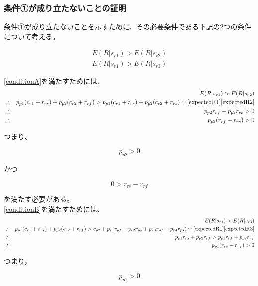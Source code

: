 \subsubsection{条件①が成り立たないことの証明}

条件①が成り立たないことを示すために、その必要条件である下記の2つの条件について考える。

\begin{gather}
  E(R|s_{r1}) > E(R|s_{r2}) \label{conditionA} \\
  E(R|s_{r1}) > E(R|s_{r3}) \label{conditionB}
\end{gather}

\eqref{conditionA}を満たすためには、
\begin{eqnarray*}
  &&E(R|s_{r1}) > E(R|s_{r2}) \\
  &\therefore& p_{p1} (c_{r1} + r_{rs}) + p_{p2} (c_{r2} + r_{rf}) > p_{p1} (c_{r1} + r_{rs}) + p_{p2} (c_{r2} + r_{rs}) \because\eqref{expectedR1}\eqref{expectedR2}  \\
  &\therefore& p_{p2} r_{rf} - p_{p2} r_{rs} > 0 \\
  &\therefore& p_{p2} (r_{rf} - r_{rs}) > 0 \\
\end{eqnarray*}

つまり、

\begin{equation}
  p_{p2} > 0 \nonumber
\end{equation}

かつ

\begin{equation}
\label{quad1}
  0 > r_{rs} - r_{rf}
\end{equation}

を満たす必要がある。\\


\eqref{conditionB}を満たすためには、
\begin{eqnarray*}
  &&E(R|s_{r1}) > E(R|s_{r3}) \\
  &\therefore& p_{p1} (c_{r1} + r_{rs}) + p_{p2} (c_{r2} + r_{rf}) > c_{p2} + p_{r1} r_{pf} + p_{r2} r_{ps} + p_{r3} r_{pf} + p_{r4} r_{ps}) \because\eqref{expectedR1}\eqref{expectedR3}\\
  &\therefore& p_{p1} r_{rs} + p_{p2} r_{rf} > p_{p1} r_{rf} + p_{p2} r_{rf} \\
  &\therefore& p_{p1} (r_{rs} - r_{rf}) > 0
\end{eqnarray*}

つまり，

\begin{equation}
   p_{p1} > 0 \nonumber
\end{equation}

